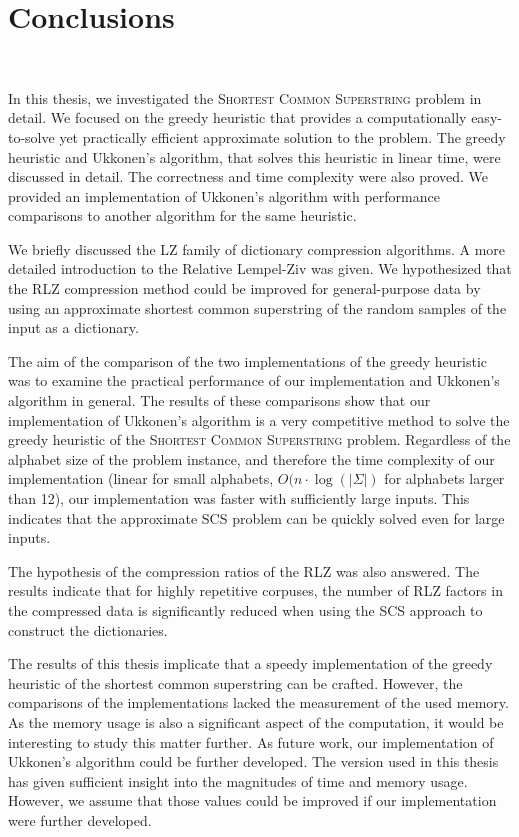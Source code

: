 \documentclass[english,twoside,censored,csm,algorithms-track-2020]{HYthesisML}
\theoremstyle{plain}
\theoremstyle{definition}
\begin{document}
\chapter{Conclusions}~\label{chp-conc}

In this thesis, we investigated the \textsc{Shortest Common Superstring} problem
in detail. We focused on the greedy heuristic that provides a computationally
easy-to-solve yet practically efficient approximate solution to the problem.
The greedy heuristic and Ukkonen's algorithm, that solves this heuristic in linear time,
were discussed in detail. The correctness and time complexity were also proved.
We provided an implementation of Ukkonen's algorithm with performance
comparisons to another algorithm for the same heuristic.

We briefly discussed the LZ family of dictionary compression algorithms.
A more detailed introduction to the Relative Lempel-Ziv was given.
We hypothesized that the RLZ compression method could be improved for
general-purpose data by using an approximate shortest common
superstring of the random samples of the input as a dictionary. 

The aim of the comparison of the two implementations of the
greedy heuristic was to examine the practical performance
of our implementation and Ukkonen's algorithm in general.
The results of these comparisons show that our implementation
of Ukkonen's algorithm is a very competitive method to solve
the greedy heuristic of the \textsc{Shortest Common Superstring}
problem. Regardless of the alphabet size of the problem instance,
and therefore the time complexity of our implementation
(linear for small alphabets, $O(n\cdot\log(|\Sigma|)$ for
alphabets larger than 12), our implementation was faster with
sufficiently large inputs. This indicates that the approximate
SCS problem can be quickly solved even for large inputs.

The hypothesis of the compression ratios of the RLZ was also
answered. The results indicate that for highly repetitive
corpuses, the number of RLZ factors in the compressed data
is significantly reduced when using the SCS approach to
construct the dictionaries.

The results of this thesis implicate that a speedy implementation of the greedy heuristic of
the shortest common superstring can be crafted.
However, the comparisons of the implementations lacked the
measurement of the used memory. As the memory usage is also
a significant aspect of the computation, it would be
interesting to study this matter further. As future
work, our implementation of Ukkonen's algorithm could
be further developed. The version used in this thesis
has given sufficient insight into the magnitudes of
time and memory usage. However, we assume that those
values could be improved if our implementation were
further developed.
\end{document}

